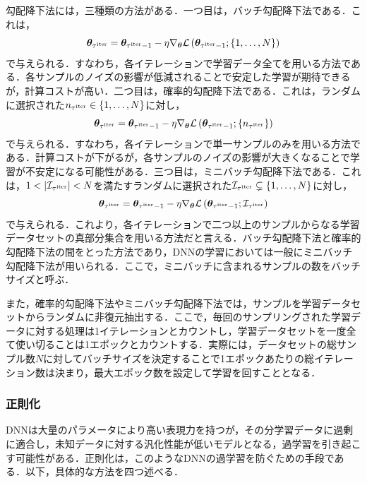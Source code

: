 勾配降下法には，三種類の方法がある\cite{zhang2019gradient}．一つ目は，バッチ勾配降下法である．これは，
\begin{equation}
    \bm{\theta}_{\tau^{\text{iter}}} = \bm{\theta}_{\tau^{\text{iter}} - 1} - \eta \nabla_{\bm{\theta}} \mathcal{L}\left(\bm{\theta}_{\tau^{\text{iter}} - 1}; \{1, \ldots, N\}\right)
\end{equation}
で与えられる．すなわち，各イテレーションで学習データ全てを用いる方法である．各サンプルのノイズの影響が低減されることで安定した学習が期待できるが，計算コストが高い．二つ目は，確率的勾配降下法である．これは，ランダムに選択された$n_{\tau^{\text{iter}}} \in \{1, \ldots, N\}$に対し，
\begin{equation}
    \bm{\theta}_{\tau^{\text{iter}}} = \bm{\theta}_{\tau^{\text{iter}} - 1} - \eta \nabla_{\bm{\theta}} \mathcal{L}\left(\bm{\theta}_{\tau^{\text{iter}} - 1}; \{n_{\tau^{\text{iter}}}\}\right)
\end{equation}
で与えられる．すなわち，各イテレーションで単一サンプルのみを用いる方法である．計算コストが下がるが，各サンプルのノイズの影響が大きくなることで学習が不安定になる可能性がある．三つ目は，ミニバッチ勾配降下法である．これは，$1 < |\mathcal{I}_{\tau^{\text{iter}}}| < N$を満たすランダムに選択された$\mathcal{I}_{\tau^{\text{iter}}} \subsetneq \{1, \ldots, N\}$に対し，
\begin{equation}
    \bm{\theta}_{\tau^{\text{iter}}} = \bm{\theta}_{\tau^{\text{iter}} - 1} - \eta \nabla_{\bm{\theta}} \mathcal{L}\left(\bm{\theta}_{\tau^{\text{iter}} - 1}; \mathcal{I}_{\tau^{\text{iter}}}\right)
\end{equation}
で与えられる．これより，各イテレーションで二つ以上のサンプルからなる学習データセットの真部分集合を用いる方法だと言える．バッチ勾配降下法と確率的勾配降下法の間をとった方法であり，DNNの学習においては一般にミニバッチ勾配降下法が用いられる．ここで，ミニバッチに含まれるサンプルの数をバッチサイズと呼ぶ．

また，確率的勾配降下法やミニバッチ勾配降下法では，サンプルを学習データセットからランダムに非復元抽出する．ここで，毎回のサンプリングされた学習データに対する処理は1イテレーションとカウントし，学習データセットを一度全て使い切ることは1エポックとカウントする．実際には，データセットの総サンプル数$N$に対してバッチサイズを決定することで1エポックあたりの総イテレーション数は決まり，最大エポック数を設定して学習を回すこととなる．

\subsubsection{正則化}
DNNは大量のパラメータにより高い表現力を持つが，その分学習データに過剰に適合し，未知データに対する汎化性能が低いモデルとなる，過学習を引き起こす可能性がある．正則化は，このようなDNNの過学習を防ぐための手段である．以下，具体的な方法を四つ述べる．

